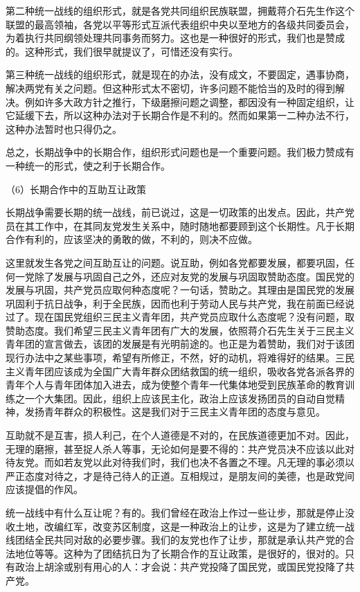 \documentclass[UTF8, 12pt, a4paper]{ctexrep}
\begin{document}
第二种统一战线的组织形式，就是各党共同组织民族联盟，拥戴蒋介石先生作这个联盟的最高领袖，各党以平等形式互派代表组织中央以至地方的各级共同委员会，为着执行共同纲领处理共同事务而努力。这也是一种很好的形式，我们也是赞成的。这种形式，我们很早就提议了，可惜还没有实行。

第三种统一战线的组织形式，就是现在的办法，没有成文，不要固定，遇事协商，解决两党有关之问题。但这种形式太不密切，许多问题不能恰当的及时的得到解决。例如许多大政方针之推行，下级磨擦问题之调整，都因没有一种固定组织，让它延缓下去，所以这种办法对于长期合作是不利的。然而如果第一二种办法不行，这种办法暂时也只得仍之。

总之，长期战争中的长期合作，组织形式问题也是一个重要问题。我们极力赞成有一种统一的形式，使之利于长期合作。

（6）长期合作中的互助互让政策

长期战争需要长期的统一战线，前已说过，这是一切政策的出发点。因此，共产党员在其工作中，在其同友党发生关系中，随时随地都要顾到这个长期性。凡于长期合作有利的，应该坚决的勇敢的做，不利的，则决不应做。

这里就发生各党之间互助互让的问题。说互助，例如各党都要发展，都要巩固，任何一党除了发展与巩固自己之外，还应对友党的发展与巩固取赞助态度。国民党的发展与巩固，共产党员应取何种态度呢？一句话，赞助之。其理由是国民党的发展巩固利于抗日战争，利于全民族，因而也利于劳动人民与共产党，我在前面已经说过了。现在国民党组织三民主义青年团，共产党员应取什么态度呢？没有问题，取赞助态度。我们希望三民主义青年团有广大的发展，依照蒋介石先生关于三民主义青年团的宣言做去，该团的发展是有光明前途的。也正是为着赞助，我们对于该团现行办法中之某些事项，希望有所修正，不然，好的动机，将难得好的结果。三民主义青年团应该成为全国广大青年群众团结救国的统一组织，吸收各党各派各界的青年个人与青年团体加入进去，成为使整个青年一代集体地受到民族革命的教育训练之一个大集团。因此，组织上应该民主化，政治上应该发扬团员的自动自觉精神，发扬青年群众的积极性。这是我们对于三民主义青年团的态度与意见。

互助就不是互害，损人利己，在个人道德是不对的，在民族道德更加不对。因此，无理的磨擦，甚至捉人杀人等事，无论如何是要不得的：共产党员决不应该以此对待友党。而如若友党以此对待我们时，我们也决不各置之不理。凡无理的事必须以严正态度对待之，才是待己待人的正道。互相规过，是朋友间的美德，也是政党间应该提倡的作风。

统一战线中有什么互让呢？有的。我们曾经在政治上作过一些让步，那就是停止没收土地，改编红军，改变苏区制度，这是一种政治上的让步，这是为了建立统一战线团结全民共同对敌的必要步骤。我们的友党也作了让步，那就是承认共产党的合法地位等等。这种为了团结抗日为了长期合作的互让政策，是很好的，很对的。只有政治上胡涂或别有用心的人：才会说：共产党投降了国民党，或国民党投降了共产党。
\end{document}
